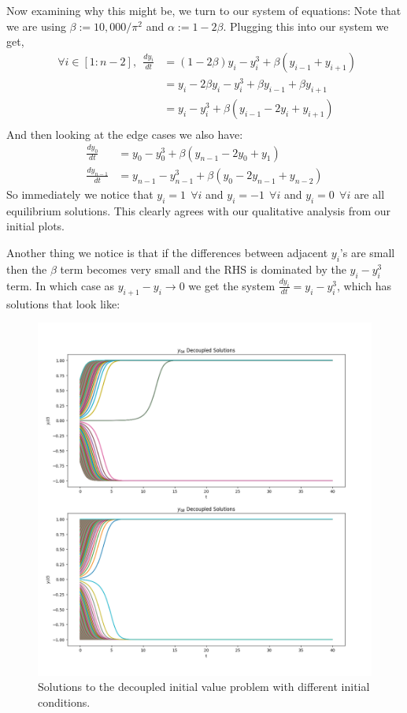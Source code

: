 \documentclass[a4paper, oneside]{book}
\begin{document}
Now examining why this might be, we turn to our system of equations:
Note that we are using $\beta := 10,000 / \pi^{2}$ and $\alpha :=  1 - 2\beta$. Plugging this into our system we get, 
\begin{align}
~ ~ \forall i \in [1:n-2], ~ ~
\frac{dy_{i}}{dt} &= (1 - 2\beta) y_{i} - y_{i}^{3} + \beta(y_{i-1} + y_{i+1}) \\
&= y_{i} - 2\beta y_{i} - y_{i}^{3} + \beta y_{i-1} + \beta y_{i+1} \\
	 & = y_{i} - y_{i}^{3} + \beta(y_{i-1} -2y_{i} + y_{i+1}) \\
\end{align}
And then looking at the edge cases we also have:
\begin{align}
\frac{dy_{0}}{dt} &= y_{0} - y_{0}^{3} + \beta(y_{n-1} - 2y_{0} + y_{1}) \\
\frac{dy_{n-1}}{dt} &= y_{n-1} - y_{n-1}^{3} + \beta(y_{0} -2 y_{n-1} + y_{n-2})
\end{align}
So immediately we notice that $y_{i} = 1 ~ ~ \forall i$ and $y_{i} = -1 ~ ~ \forall i$ and $y_{i} = 0 ~ ~ \forall i$ are all equilibrium
solutions. This clearly agrees with our qualitative analysis from our initial plots.

Another thing we notice is that if the differences between adjacent $y_{i}$'s are small then
the $\beta$ term becomes very small and the RHS is dominated by the $y_{i} - y_{i}^{3}$ term. In which case
as $y_{i+1} - y_{i} \to 0$ we get the system $\frac{dy_{i}}{dt} = y_{i} - y_{i}^{3}$, which has solutions that look like:

\begin{figure}[htpb]
    \centering
    \includegraphics[width=1.0\textwidth]{./images/Pasted image 20231120143413.png}
    \caption{Solutions to the decoupled initial value problem with different initial conditions.}
\end{figure}
\clearpage
\end{document}
